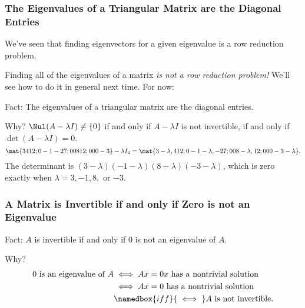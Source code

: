 
\begin{frame}
\frametitle{The Eigenvalues of a Triangular Matrix are the Diagonal Entries}

We've seen that finding eigenvectors for a given eigenvalue is a row reduction
problem.

\pause\medskip
Finding all of the eigenvalues of a matrix \emph{is not a row reduction problem!\/}
\pause
We'll see how to do it in general next time.
\pause
For now:

\bigskip
\alert{Fact:} The eigenvalues of a triangular matrix are the diagonal entries.

\bigskip
\begin{webonly}
\alert{Why?} $\Nul(A-\lambda I)\neq\{0\}$ if and only if $A-\lambda I$ is not
invertible, if and only if $\det(A-\lambda I)= 0$.
\[ \mat{3 4 1 2; 0 -1 -2 7; 0 0 8 12; 0 0 0 -3} - \lambda I_4 =
\mat{3-\lambda, 4 1 2; 0 -1-\lambda, -2 7;
  0 0 8-\lambda, 12; 0 0 0 -3-\lambda}. \]
The determinant is
$(3-\lambda)(-1-\lambda)(8-\lambda)(-3-\lambda)$,
which is zero exactly when
$\lambda=3,-1,8,$ or $-3$.
\end{webonly}

\end{frame}



\begin{frame}
\frametitle{A Matrix is Invertible if and only if Zero is not an Eigenvalue}

\alert{Fact:} $A$ is invertible if and only if $0$ is not an eigenvalue of $A$.

\bigskip
\begin{webonly}
\alert{Why?}\\[-6mm]
\[\begin{split}
\text{$0$ is an eigenvalue of $A$} 
&\iff
\text{$Ax=0x$ has a nontrivial solution} \\
&\iff\text{$Ax=0$ has a nontrivial solution} \\
&\namedbox{iff}{{}\iff{}}\text{$A$ is not invertible.}
\end{split}\]
\end{webonly}

\end{frame}


